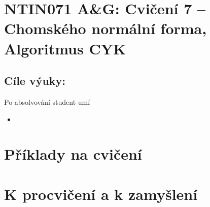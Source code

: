 \documentclass[a4paper,12pt]{amsart}
\begin{document}
\thispagestyle{empty}

\section*{NTIN071 A\&G: Cvičení 7 -- Chomského normální forma, Algoritmus CYK}

\medskip

\subsection*{Cíle výuky:} Po absolvování student umí

\begin{itemize}\setlength{\itemsep}{0pt}
    \item 
\end{itemize}

\section*{Příklady na cvičení}

\medskip\begin{problem} 

\end{problem}


\section*{K procvičení a k zamyšlení}


\medskip\begin{problem}

\end{problem}
\end{document}
